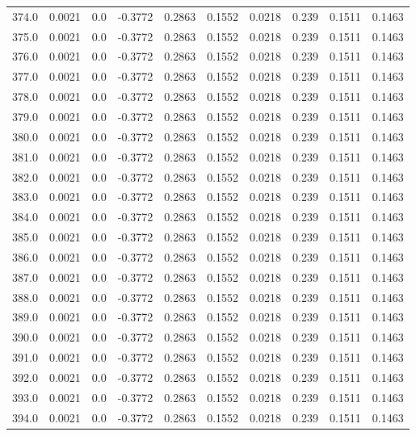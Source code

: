 \begin{longtable}{lrrrrrrrrr}
374.0 & 0.0021 & 0.0 & -0.3772 & 0.2863 & 0.1552 & 0.0218 & 0.239 & 0.1511 & 0.1463 \\
375.0 & 0.0021 & 0.0 & -0.3772 & 0.2863 & 0.1552 & 0.0218 & 0.239 & 0.1511 & 0.1463 \\
376.0 & 0.0021 & 0.0 & -0.3772 & 0.2863 & 0.1552 & 0.0218 & 0.239 & 0.1511 & 0.1463 \\
377.0 & 0.0021 & 0.0 & -0.3772 & 0.2863 & 0.1552 & 0.0218 & 0.239 & 0.1511 & 0.1463 \\
378.0 & 0.0021 & 0.0 & -0.3772 & 0.2863 & 0.1552 & 0.0218 & 0.239 & 0.1511 & 0.1463 \\
379.0 & 0.0021 & 0.0 & -0.3772 & 0.2863 & 0.1552 & 0.0218 & 0.239 & 0.1511 & 0.1463 \\
380.0 & 0.0021 & 0.0 & -0.3772 & 0.2863 & 0.1552 & 0.0218 & 0.239 & 0.1511 & 0.1463 \\
381.0 & 0.0021 & 0.0 & -0.3772 & 0.2863 & 0.1552 & 0.0218 & 0.239 & 0.1511 & 0.1463 \\
382.0 & 0.0021 & 0.0 & -0.3772 & 0.2863 & 0.1552 & 0.0218 & 0.239 & 0.1511 & 0.1463 \\
383.0 & 0.0021 & 0.0 & -0.3772 & 0.2863 & 0.1552 & 0.0218 & 0.239 & 0.1511 & 0.1463 \\
384.0 & 0.0021 & 0.0 & -0.3772 & 0.2863 & 0.1552 & 0.0218 & 0.239 & 0.1511 & 0.1463 \\
385.0 & 0.0021 & 0.0 & -0.3772 & 0.2863 & 0.1552 & 0.0218 & 0.239 & 0.1511 & 0.1463 \\
386.0 & 0.0021 & 0.0 & -0.3772 & 0.2863 & 0.1552 & 0.0218 & 0.239 & 0.1511 & 0.1463 \\
387.0 & 0.0021 & 0.0 & -0.3772 & 0.2863 & 0.1552 & 0.0218 & 0.239 & 0.1511 & 0.1463 \\
388.0 & 0.0021 & 0.0 & -0.3772 & 0.2863 & 0.1552 & 0.0218 & 0.239 & 0.1511 & 0.1463 \\
389.0 & 0.0021 & 0.0 & -0.3772 & 0.2863 & 0.1552 & 0.0218 & 0.239 & 0.1511 & 0.1463 \\
390.0 & 0.0021 & 0.0 & -0.3772 & 0.2863 & 0.1552 & 0.0218 & 0.239 & 0.1511 & 0.1463 \\
391.0 & 0.0021 & 0.0 & -0.3772 & 0.2863 & 0.1552 & 0.0218 & 0.239 & 0.1511 & 0.1463 \\
392.0 & 0.0021 & 0.0 & -0.3772 & 0.2863 & 0.1552 & 0.0218 & 0.239 & 0.1511 & 0.1463 \\
393.0 & 0.0021 & 0.0 & -0.3772 & 0.2863 & 0.1552 & 0.0218 & 0.239 & 0.1511 & 0.1463 \\
394.0 & 0.0021 & 0.0 & -0.3772 & 0.2863 & 0.1552 & 0.0218 & 0.239 & 0.1511 & 0.1463 \\

\end{longtable}
